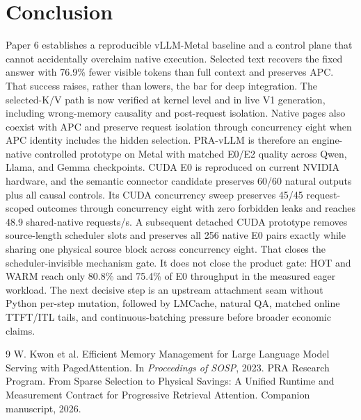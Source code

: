 \documentclass[10pt]{article}
\begin{document}
\section{Conclusion}
Paper 6 establishes a reproducible vLLM-Metal baseline and a control plane that
cannot accidentally overclaim native execution. Selected
text recovers the fixed answer with 76.9\% fewer visible tokens than full
context and preserves APC. That success raises, rather than lowers, the bar for
deep integration. The selected-K/V path is now verified at kernel level and in
live V1 generation, including wrong-memory causality and post-request isolation.
Native pages also coexist with APC and preserve request isolation through
concurrency eight when APC identity includes the hidden selection. PRA-vLLM is
therefore an engine-native controlled prototype on Metal with matched E0/E2
quality across Qwen, Llama, and Gemma checkpoints. CUDA E0 is reproduced on
current NVIDIA hardware, and the semantic connector candidate preserves 60/60
natural outputs plus all causal controls. Its CUDA concurrency sweep preserves
45/45 request-scoped outcomes through concurrency eight with zero forbidden
leaks and reaches 48.9 shared-native requests/s. A subsequent detached CUDA
prototype removes source-length scheduler slots and preserves all 256 native
E0 pairs exactly while sharing one physical source block across concurrency
eight. That closes the scheduler-invisible mechanism gate. It does not close
the product gate: HOT and WARM reach only 80.8\% and 75.4\% of E0 throughput in
the measured eager workload. The next decisive step is an upstream attachment
seam without Python per-step mutation, followed by LMCache, natural QA, matched
online TTFT/ITL tails, and continuous-batching pressure before broader economic
claims.

\begin{thebibliography}{9}
W. Kwon et al.
\newblock Efficient Memory Management for Large Language Model Serving with PagedAttention.
\newblock In \emph{Proceedings of SOSP}, 2023.
PRA Research Program.
\newblock From Sparse Selection to Physical Savings: A Unified Runtime and
Measurement Contract for Progressive Retrieval Attention.
\newblock Companion manuscript, 2026.
\end{thebibliography}
\end{document}
